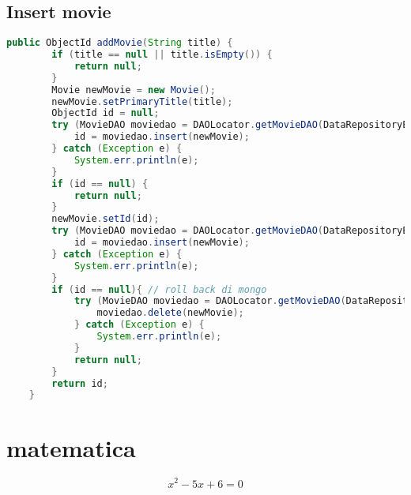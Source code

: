 \begin{alphasection}
\subsection{Insert movie}
\begin{lstlisting}[language=Java]
public ObjectId addMovie(String title) {
        if (title == null || title.isEmpty()) {
            return null;
        }
        Movie newMovie = new Movie();
        newMovie.setPrimaryTitle(title);
        ObjectId id = null;
        try (MovieDAO moviedao = DAOLocator.getMovieDAO(DataRepositoryEnum.MONGO)) {
            id = moviedao.insert(newMovie);
        } catch (Exception e) {
            System.err.println(e);
        }
        if (id == null) {
            return null;
        }
        newMovie.setId(id);
        try (MovieDAO moviedao = DAOLocator.getMovieDAO(DataRepositoryEnum.NEO4j)) {
            id = moviedao.insert(newMovie);
        } catch (Exception e) {
            System.err.println(e);
        }
        if (id == null){ // roll back di mongo
            try (MovieDAO moviedao = DAOLocator.getMovieDAO(DataRepositoryEnum.MONGO)) {
                moviedao.delete(newMovie);
            } catch (Exception e) {
                System.err.println(e);
            }
            return null;
        }
        return id;
    }
\end{lstlisting}
\section{matematica}\label{eq:pippo}
\begin{equation}\label{pippo}
x^2-5x+6=0
\end{equation}
\end{alphasection}

